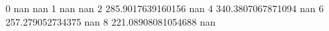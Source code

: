 0 nan nan
1 nan nan
2 285.9017639160156 nan
4 340.3807067871094 nan
6 257.279052734375 nan
8 221.08908081054688 nan
